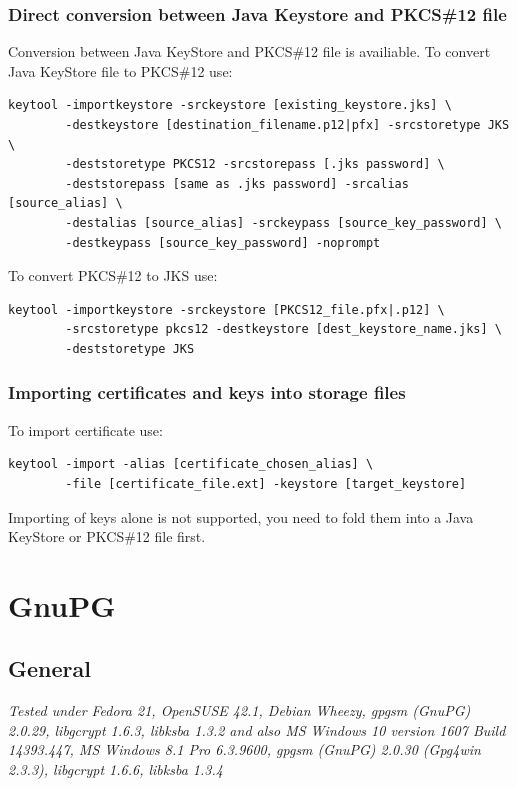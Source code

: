 \documentclass[10pt, a4paper]{report}
\begin{document}
  \subsection{Direct conversion between Java Keystore and PKCS\#12 file}
Conversion between Java KeyStore and PKCS\#12 file is availiable. To convert Java KeyStore file to PKCS\#12 use:
\begin{verbatim}
keytool -importkeystore -srckeystore [existing_keystore.jks] \
        -destkeystore [destination_filename.p12|pfx] -srcstoretype JKS \
        -deststoretype PKCS12 -srcstorepass [.jks password] \
        -deststorepass [same as .jks password] -srcalias [source_alias] \
        -destalias [source_alias] -srckeypass [source_key_password] \
        -destkeypass [source_key_password] -noprompt
\end{verbatim}

To convert PKCS\#12 to JKS use:
\begin{verbatim}
keytool -importkeystore -srckeystore [PKCS12_file.pfx|.p12] \
        -srcstoretype pkcs12 -destkeystore [dest_keystore_name.jks] \
        -deststoretype JKS
\end{verbatim}

  
  \subsection{Importing certificates and keys into storage files}
To import certificate use:
\begin{verbatim}
keytool -import -alias [certificate_chosen_alias] \
        -file [certificate_file.ext] -keystore [target_keystore]  
\end{verbatim}

Importing of keys alone is not supported, you need to fold them into a Java KeyStore or PKCS\#12 file first.



\chapter{GnuPG}

\section{General}

\textit{Tested under Fedora 21, OpenSUSE 42.1, Debian Wheezy, gpgsm (GnuPG) 2.0.29, libgcrypt 1.6.3, libksba 1.3.2 and also MS Windows 10 version 1607 Build 14393.447, MS Windows 8.1 Pro 6.3.9600, gpgsm (GnuPG) 2.0.30 (Gpg4win 2.3.3), libgcrypt 1.6.6, libksba 1.3.4}
\end{document}
